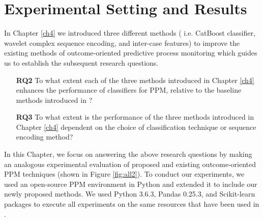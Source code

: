 
\chapter{Experimental Setting and Results} \label{ch5}%
In Chapter \ref{ch4} we introduced three different methods ( i.e. CatBoost classifier, wavelet complex sequence encoding, and inter-case features) to improve the existing methods of outcome-oriented predictive process monitoring which guides us to establish the subsequent research questions. 

	\begin{itemize}[itemindent=0em]
	\item[\textbf{RQ2}] To what extent each of the three methods introduced in Chapter \ref{ch4} enhances the performance of classifiers for PPM, relative to the baseline methods introduced in \cite{teinemaa2019outcome}?
	
	\item[\textbf{RQ3}]  To what extent is the performance of the three methods introduced in Chapter \ref{ch4} dependent on the choice of classification technique or sequence encoding method?
	
\end{itemize}

In this Chapter, we focus on answering the above research questions by making an analogous experimental evaluation of proposed and existing outcome-oriented PPM techniques (shown in Figure \ref{fig:all2}). To conduct our experiments, we used an open-source PPM environment in Python \cite{teinemaa2019outcome} and extended it to include our newly proposed methods. We used Python 3.6.3, Pandas 0.25.3, and Scikit-learn packages \cite{pedregosa2011scikit} to execute all experiments on the same resources that have been used in \cite{teinemaa2019outcome}.


